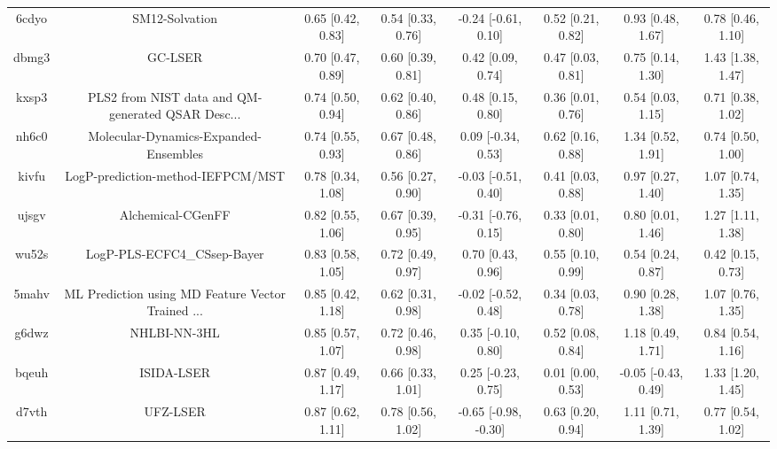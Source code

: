 \documentclass{article}
\begin{document}
\begin{center}
\begin{longtable}{|cccccccc|}
 6cdyo &                                     SM12-Solvation &  0.65 [0.42, 0.83] &  0.54 [0.33, 0.76] &   -0.24 [-0.61, 0.10] &  0.52 [0.21, 0.82] &    0.93 [0.48, 1.67] &     0.78 [0.46, 1.10] \\
 dbmg3 &                                            GC-LSER &  0.70 [0.47, 0.89] &  0.60 [0.39, 0.81] &     0.42 [0.09, 0.74] &  0.47 [0.03, 0.81] &    0.75 [0.14, 1.30] &     1.43 [1.38, 1.47] \\
 kxsp3 &  PLS2 from NIST data and QM-generated QSAR Desc... &  0.74 [0.50, 0.94] &  0.62 [0.40, 0.86] &     0.48 [0.15, 0.80] &  0.36 [0.01, 0.76] &    0.54 [0.03, 1.15] &     0.71 [0.38, 1.02] \\
 nh6c0 &              Molecular-Dynamics-Expanded-Ensembles &  0.74 [0.55, 0.93] &  0.67 [0.48, 0.86] &    0.09 [-0.34, 0.53] &  0.62 [0.16, 0.88] &    1.34 [0.52, 1.91] &     0.74 [0.50, 1.00] \\
 kivfu &                  LogP-prediction-method-IEFPCM/MST &  0.78 [0.34, 1.08] &  0.56 [0.27, 0.90] &   -0.03 [-0.51, 0.40] &  0.41 [0.03, 0.88] &    0.97 [0.27, 1.40] &     1.07 [0.74, 1.35] \\
 ujsgv &                                  Alchemical-CGenFF &  0.82 [0.55, 1.06] &  0.67 [0.39, 0.95] &   -0.31 [-0.76, 0.15] &  0.33 [0.01, 0.80] &    0.80 [0.01, 1.46] &     1.27 [1.11, 1.38] \\
 wu52s &                        LogP-PLS-ECFC4\_CSsep-Bayer &  0.83 [0.58, 1.05] &  0.72 [0.49, 0.97] &     0.70 [0.43, 0.96] &  0.55 [0.10, 0.99] &    0.54 [0.24, 0.87] &     0.42 [0.15, 0.73] \\
 5mahv &  ML Prediction using MD Feature Vector Trained ... &  0.85 [0.42, 1.18] &  0.62 [0.31, 0.98] &   -0.02 [-0.52, 0.48] &  0.34 [0.03, 0.78] &    0.90 [0.28, 1.38] &     1.07 [0.76, 1.35] \\
 g6dwz &                                       NHLBI-NN-3HL &  0.85 [0.57, 1.07] &  0.72 [0.46, 0.98] &    0.35 [-0.10, 0.80] &  0.52 [0.08, 0.84] &    1.18 [0.49, 1.71] &     0.84 [0.54, 1.16] \\
 bqeuh &                                         ISIDA-LSER &  0.87 [0.49, 1.17] &  0.66 [0.33, 1.01] &    0.25 [-0.23, 0.75] &  0.01 [0.00, 0.53] &  -0.05 [-0.43, 0.49] &     1.33 [1.20, 1.45] \\
 d7vth &                                           UFZ-LSER &  0.87 [0.62, 1.11] &  0.78 [0.56, 1.02] &  -0.65 [-0.98, -0.30] &  0.63 [0.20, 0.94] &    1.11 [0.71, 1.39] &     0.77 [0.54, 1.02] \\

\end{longtable}
\end{center}
\end{document}
